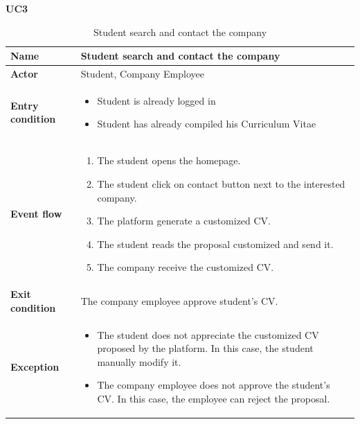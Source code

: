     \textbf{UC3}
    \begin{table}[H]
    \centering
    \begin{tabular}{|l|p{11.9cm}|}
        \hline
        \textbf{Name}            & Student search and contact the company \\\hline
        \textbf{Actor}           & Student, Company Employee         \\\hline
        \textbf{Entry condition} &
        \begin{itemize}
              \item Student is already logged in
              \item Student has already compiled his Curriculum Vitae
        \end{itemize}                                        \\\hline
        \textbf{Event flow}      &
        \begin{enumerate}[label=\arabic*.]
              \item The student opens the homepage.
              \item The student click on contact button next to the interested company.
              \item The platform generate a customized CV.
              \item The student reads the proposal customized and send it.
              \item The company receive the customized CV.
        \end{enumerate}            \\\hline
        \textbf{Exit condition}  & The company employee approve student's CV.\\\hline
        \textbf{Exception}       &  
        \begin{itemize}
              \item The student does not appreciate the customized CV proposed by the platform. In this case, the student manually modify it.
              \item The company employee does not approve the student's CV. In this case, the employee can reject the proposal.  
        \end{itemize} 
        \\\hline
    \end{tabular}
    \caption{Student search and contact the company}
    \label{table:Student search and contact the company}
    \end{table}

